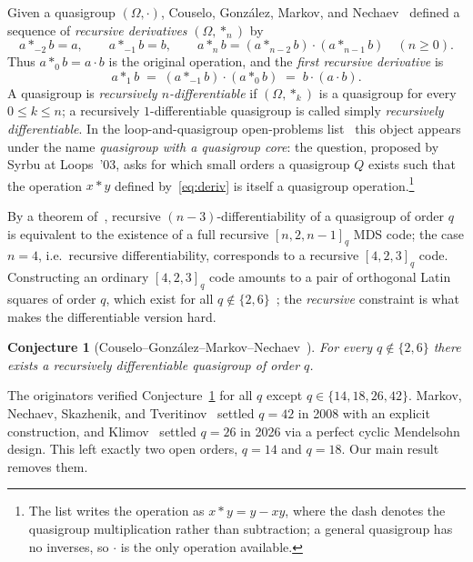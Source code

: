 \documentclass[11pt]{article}
\newtheorem{conjecture}[theorem]{Conjecture}
\theoremstyle{definition}
\newcommand{\Om}{\Omega}
\begin{document}
Given a quasigroup $(\Om,\cdot)$, Couselo, Gonz\'alez, Markov, and Nechaev~\cite{CGMN}
defined a sequence of \emph{recursive derivatives} $(\Om,*_n)$ by
\begin{equation}\label{eq:recurrence}
  a*_{-2}b=a,\qquad a*_{-1}b=b,\qquad a*_{n}b=(a*_{n-2}b)\cdot(a*_{n-1}b)\quad(n\ge0).
\end{equation}
Thus $a*_0 b=a\cdot b$ is the original operation, and the \emph{first recursive
derivative} is
\begin{equation}\label{eq:deriv}
  a*_1 b \;=\; (a*_{-1}b)\cdot(a*_0 b)\;=\;b\cdot(a\cdot b).
\end{equation}
A quasigroup is \emph{recursively $n$-differentiable} if $(\Om,*_k)$ is a quasigroup for
every $0\le k\le n$; a recursively $1$-differentiable quasigroup is called simply
\emph{recursively differentiable}. In the loop-and-quasigroup open-problems
list~\cite{KV} this object appears under the name \emph{quasigroup with a quasigroup
core}: the question, proposed by Syrbu at Loops~'03, asks for which small orders a
quasigroup $Q$ exists such that the operation $x*y$ defined by~\eqref{eq:deriv} is itself
a quasigroup operation.\footnote{The list writes the operation as $x*y=y-xy$, where the
dash denotes the quasigroup multiplication rather than subtraction; a general quasigroup
has no inverses, so $\cdot$ is the only operation available.}

By a theorem of~\cite{CGMN}, recursive $(n-3)$-differentiability of a quasigroup of order
$q$ is equivalent to the existence of a full recursive $[n,2,n-1]_q$ MDS code; the case
$n=4$, i.e.\ recursive differentiability, corresponds to a recursive $[4,2,3]_q$ code.
Constructing an ordinary $[4,2,3]_q$ code amounts to a pair of orthogonal Latin squares
of order $q$, which exist for all $q\notin\{2,6\}$~\cite{BSP}; the
\emph{recursive} constraint is what makes the differentiable version hard.

\begin{conjecture}[Couselo--Gonz\'alez--Markov--Nechaev~\cite{CGMN}]\label{conj:cgmn}
For every $q\notin\{2,6\}$ there exists a recursively differentiable quasigroup of order
$q$.
\end{conjecture}

The originators verified Conjecture~\ref{conj:cgmn} for all $q$ except
$q\in\{14,18,26,42\}$. Markov, Nechaev, Skazhenik, and Tveritinov~\cite{MNST} settled
$q=42$ in 2008 with an explicit construction, and Klimov~\cite{Klimov} settled $q=26$ in
2026 via a perfect cyclic Mendelsohn design. This left exactly two open orders,
$q=14$ and $q=18$. Our main result removes them.
\end{document}
